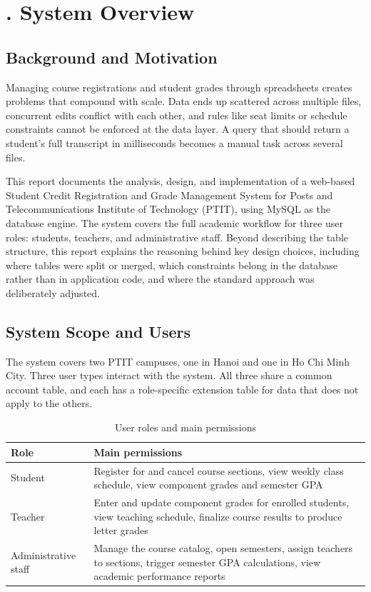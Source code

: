 \documentclass[12pt,a4paper]{report}
\begin{document}
\tableofcontents
\listoftables
\clearpage

\chapter{. System Overview}

\section{Background and Motivation}

Managing course registrations and student grades through spreadsheets creates problems that compound with scale. Data ends up scattered across multiple files, concurrent edits conflict with each other, and rules like seat limits or schedule constraints cannot be enforced at the data layer. A query that should return a student's full transcript in milliseconds becomes a manual task across several files.

This report documents the analysis, design, and implementation of a web-based Student Credit Registration and Grade Management System for Posts and Telecommunications Institute of Technology (PTIT), using MySQL as the database engine. The system covers the full academic workflow for three user roles: students, teachers, and administrative staff. Beyond describing the table structure, this report explains the reasoning behind key design choices, including where tables were split or merged, which constraints belong in the database rather than in application code, and where the standard approach was deliberately adjusted.

\section{System Scope and Users}

The system covers two PTIT campuses, one in Hanoi and one in Ho Chi Minh City. Three user types interact with the system. All three share a common account table, and each has a role-specific extension table for data that does not apply to the others.

\begin{table}[H]
\renewcommand{\arraystretch}{1.35}
\caption{User roles and main permissions}
\label{tab:roles}
\begin{tabular}{|p{3.8cm}|p{9.9cm}|}
  \hline
  \textbf{Role} & \textbf{Main permissions} \\
  \hline
  Student & Register for and cancel course sections, view weekly class schedule, view component grades and semester GPA \\
  \hline
  Teacher & Enter and update component grades for enrolled students, view teaching schedule, finalize course results to produce letter grades \\
  \hline
  Administrative staff & Manage the course catalog, open semesters, assign teachers to sections, trigger semester GPA calculations, view academic performance reports \\
  \hline
\end{tabular}
\end{table}
\end{document}
